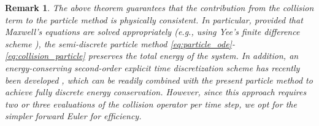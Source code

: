 \documentclass[]{article}
\numberwithin{equation}{section}
\newtheorem{remark}[theorem]{Remark}
\begin{document}


\begin{remark}
\label{remark-cons}
The above theorem guarantees that the contribution from the collision term to the particle method is physically consistent. In particular, provided that Maxwell's equations are solved appropriately (e.g., using Yee's finite difference scheme \cite{Yee66}), the semi-discrete particle method \eqref{eq:particle_ode}-\eqref{eq:collision_particle} preserves the total energy of the system. In addition, an energy-conserving second-order explicit time discretization scheme has recently been developed \cite{yoo2025explicit}, which can be readily combined with the present particle method to achieve fully discrete energy conservation. However, since this approach requires two or three evaluations of the collision operator per time step, we opt for the simpler forward Euler for efficiency.
\end{remark}
\end{document}
